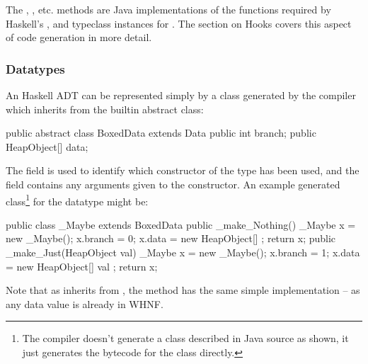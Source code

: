 \documentclass[dissertation.tex]{subfiles}
\begin{document}
{{{            

            The , , etc. methods are Java implementations of the functions required by Haskell's
            ,  and  typeclass instances for . The section on
            Hooks covers this aspect of code generation in more detail.

        }
        \subsubsection{Datatypes}
        {
            
            An Haskell ADT can be represented simply by a class generated by the compiler which inherits from the
             builtin abstract class:

            \begin{javafigure}
            public abstract class BoxedData extends Data {
                public int branch;
                public HeapObject[] data;
            }
            \end{javafigure}

            The  field is used to identify which constructor of the type has been used, and the
             field contains any arguments given to the constructor. An example generated
            class\footnote{The compiler doesn't generate a class described in Java source as shown, it just
            generates the bytecode for the class directly.} for the datatype  might be:

            \begin{javafigure}
            public class _Maybe extends BoxedData {
                public _make_Nothing() {
                    _Maybe x = new _Maybe();
                    x.branch = 0;
                    x.data = new HeapObject[] {};
                    return x;
                }
                public _make_Just(HeapObject val) {
                    _Maybe x = new _Maybe();
                    x.branch = 1;
                    x.data = new HeapObject[] { val };
                    return x;
                }
            }
            \end{javafigure}

            Note that as  inherits from , the  method has the same simple
            implementation -- as any data value is already in WHNF.

}}}
\end{document}

